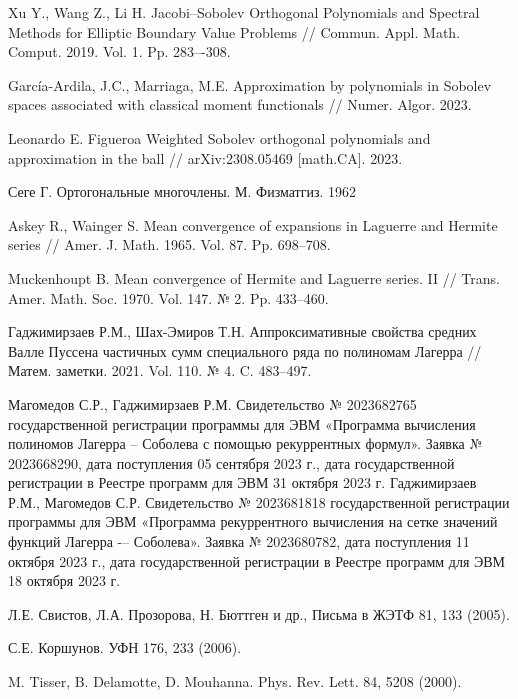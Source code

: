 \begin{thebibliography}{111}
{Xu Y., Wang Z., Li H.} Jacobi–Sobolev Orthogonal Polynomials and Spectral Methods for Elliptic Boundary Value Problems //
Commun. Appl. Math. Comput. 2019. Vol. 1. Pp. 283–-308.

{Garc\'ia-Ardila, J.C., Marriaga, M.E.} Approximation by polynomials in Sobolev spaces associated with classical moment functionals //
Numer. Algor. 2023.

{Leonardo E. Figueroa} Weighted Sobolev orthogonal polynomials and approximation in the ball // arXiv:2308.05469 [math.CA]. 2023.

{Сеге Г.} Ортогональные многочлены. М. Физматгиз. 1962

{Askey R., Wainger S.} Mean convergence of expansions in Laguerre and Hermite series // Amer. J. Math. 1965. Vol. 87. Pp. 698--708.

{Muckenhoupt B.} Mean convergence of Hermite and Laguerre series. II // Trans. Amer. Math. Soc. 1970. Vol. 147. № 2. Pp. 433--460.

{Гаджимирзаев Р.М., Шах-Эмиров Т.Н.} Аппроксимативные свойства средних Валле Пуссена частичных сумм специального ряда по полиномам Лагерра //
Матем. заметки. 2021. Vol. 110. № 4. C. 483--497.												

{Магомедов С.Р., Гаджимирзаев Р.М.} Свидетельство № 2023682765 государственной регистрации программы для ЭВМ «Программа вычисления полиномов Лагерра -- Соболева с помощью рекуррентных формул». Заявка № 2023668290, дата поступления 05 сентября 2023 г., дата государственной регистрации в Реестре программ для ЭВМ 31 октября 2023 г.
{Гаджимирзаев Р.М., Магомедов С.Р.} Свидетельство № 2023681818 государственной регистрации программы для ЭВМ «Программа рекуррентного вычисления на сетке значений функций Лагерра -– Соболева». Заявка № 2023680782, дата поступления 11 октября 2023 г., дата государственной регистрации в Реестре программ для ЭВМ 18 октября 2023 г.


Л.Е. Свистов, Л.А. Прозорова, Н. Бюттген и др., Письма в ЖЭТФ 81, 133 (2005).

С.Е. Коршунов. УФН 176, 233 (2006).

M. Tisser, B. Delamotte, D. Mouhanna. Phys. Rev. Lett. 84, 5208 (2000).


\end{thebibliography}
